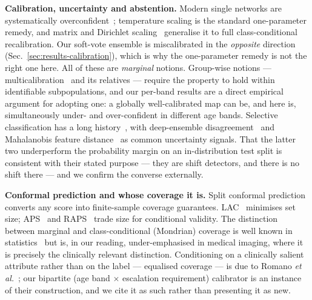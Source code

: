 \documentclass[journal]{IEEEtran}
\begin{document}
\textbf{Calibration, uncertainty and abstention.} Modern single networks are systematically
overconfident~\cite{guo2017calibration}; temperature scaling is the standard one-parameter
remedy, and matrix and Dirichlet scaling~\cite{kull2019dirichlet} generalise it to full
class-conditional recalibration. Our soft-vote ensemble is miscalibrated in the \emph{opposite}
direction (Sec.~\ref{sec:results-calibration}), which is why the one-parameter remedy is not
the right one here. All of these are \emph{marginal} notions. Group-wise notions ---
multicalibration~\cite{hebertjohnson2018multicalibration} and its relatives --- require the
property to hold within identifiable subpopulations, and our per-band results are a direct
empirical argument for adopting one: a globally well-calibrated map can be, and here is,
simultaneously under- and over-confident in different age bands. Selective classification has
a long history~\cite{elyaniv2010selective,geifman2017selectivenet}, with deep-ensemble
disagreement~\cite{lakshminarayanan2017deepensembles} and Mahalanobis feature
distance~\cite{lee2018mahalanobis} as common uncertainty signals. That the latter two
underperform the probability margin on an in-distribution test split is consistent with their
stated purpose --- they are shift detectors, and there is no shift there --- and we confirm
the converse externally.

\textbf{Conformal prediction and whose coverage it is.} Split conformal
prediction~\cite{vovk2005algorithmic,angelopoulos2023gentle} converts any score into
finite-sample coverage guarantees. LAC~\cite{sadinle2019lac} minimises set size;
APS~\cite{romano2020aps} and RAPS~\cite{angelopoulos2021raps} trade size for conditional
validity. The distinction between marginal and class-conditional (Mondrian) coverage is well
known in statistics~\cite{vovk2012conditional} but is, in our reading, under-emphasised in
medical imaging, where it is precisely the clinically relevant distinction. Conditioning on a
clinically salient attribute rather than on the label --- equalised coverage --- is due to
Romano \emph{et al.}~\cite{romano2020equalized}; our bipartite (age band $\times$ escalation
requirement) calibrator is an instance of their construction, and we cite it as such rather
than presenting it as new.
\end{document}
